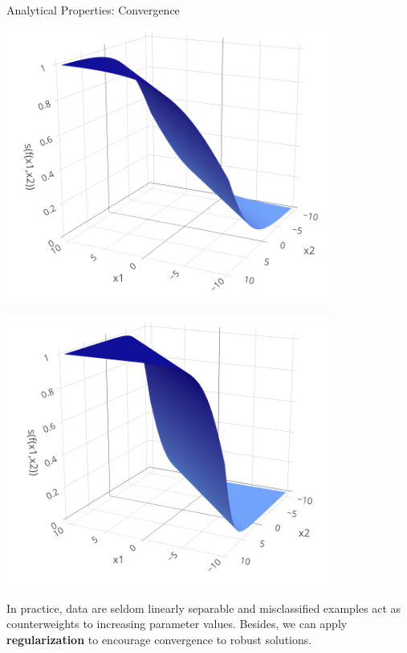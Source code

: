 \begin{vbframe}{Analytical Properties: Convergence}
\begin{itemize}
  \vspace{0.3cm}
  \begin{minipage}[b]{0.4\textwidth}
    \includegraphics[width=0.8\textwidth]{figure/softmax_1}
  \end{minipage}%
  \begin{minipage}[b]{0.4\textwidth}
    \includegraphics[width=0.8\textwidth]{figure/softmax_2}
  \end{minipage}%
\end{itemize}  

\vfill

In practice, data are seldom linearly separable and misclassified 
examples act as counterweights to increasing parameter values. Besides, we 
can apply \textbf{regularization} to encourage convergence to robust solutions.

\end{vbframe}


\endlecture

